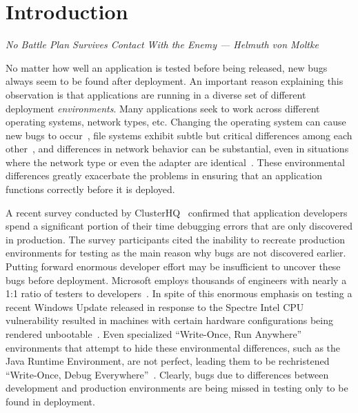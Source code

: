 \section{Introduction}

\textit{No Battle Plan Survives Contact With the Enemy --- Helmuth von Moltke}

No matter how well an application is tested before being released, new
bugs always seem to be found after deployment. An important reason
explaining this observation is that applications are running in a
diverse set of different deployment \emph{environments}. Many
applications seek to work across different operating systems, network
types, etc.  Changing the operating system can cause new bugs to
occur~\cite{LinuxGlibcChanges}, file systems exhibit subtle but
critical differences among each other~\cite{EXT4Layout, AppleHFS}, and differences
in network behavior can be substantial, even in situations where the
network type or even the adapter are identical~\cite{vbox}. These
environmental differences greatly exacerbate the problems in ensuring
that an application functions correctly before it is deployed.

A recent survey conducted by ClusterHQ~\cite{ClusterHQSurvey}
confirmed that application developers spend a significant portion of
their time debugging errors that are only discovered in production.
The survey participants cited the inability to recreate production
environments for testing as the main reason why bugs are not
discovered earlier.  Putting forward enormous developer effort may be
insufficient to uncover these bugs before deployment.  Microsoft
employs thousands of engineers with nearly a 1:1 ratio of testers to
developers~\cite{Page2009}.  In spite of this enormous emphasis on
testing a recent Windows Update released in response to the Spectre
Intel CPU vulnerability resulted in machines with certain hardware
configurations being rendered unbootable~\cite{kb4056892}.  Even
specialized ``Write-Once, Run Anywhere'' environments that attempt to
hide these environmental differences, such as the Java Runtime
Environment, are not perfect, leading them to be rechristened
``Write-Once, Debug Everywhere''~\cite{WODE}.  Clearly, bugs due to
differences between development and production environments are being
missed in testing only to be found in deployment.



